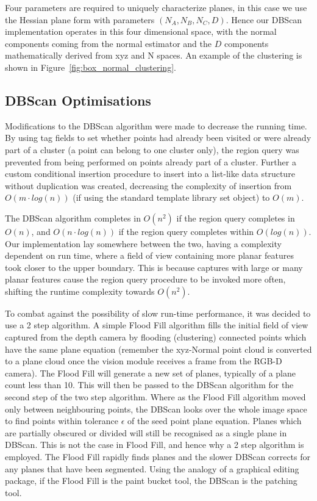 \documentclass[]{article}
\begin{document}
{Four parameters are required to uniquely characterize planes, in this case we use the Hessian plane form with parameters $(N_A, N_B, N_C, D)$. Hence our DBScan implementation operates in this four dimensional space, with the normal components coming from the normal estimator and the $D$ components mathematically derived from xyz and N spaces. An example of the clustering is shown in Figure~\ref{fig:box_normal_clustering}.

\subsection{DBScan Optimisations} %
\label{sub:dbscan_optimisations}


Modifications to the DBScan algorithm were made to decrease the running time. By using tag fields to set whether points had already been visited or were already part of a cluster (a point can belong to one cluster only), the region query was prevented from being performed on points already part of a cluster. Further a custom conditional insertion procedure to insert into a list-like data structure without duplication was created, decreasing the complexity of insertion from $O(m \cdot log(n))$ (if using the standard template library set object) to $O(m)$.

The DBScan algorithm completes in $O(n^2)$ if the region query completes in $O(n)$, and $O(n \cdot log(n))$ if the region query completes within $O(log(n))$. Our implementation lay somewhere between the two, having a complexity dependent on run time, where a field of view containing more planar features took closer to the upper boundary. This is because captures with large or many planar features cause the region query procedure to be invoked more often, shifting the runtime complexity towards $O(n^2)$.

To combat against the possibility of slow run-time performance, it was decided to use a 2 step algorithm. A simple Flood Fill algorithm fills the initial field of view captured from the depth camera by flooding (clustering) connected points which have the same plane equation (remember the xyz-Normal point cloud is converted to a plane cloud once the vision module receives a frame from the RGB-D camera). The Flood Fill will generate a new set of planes, typically of a plane count less than 10. This will then be passed to the DBScan algorithm for the second step of the two step algorithm. Where as the Flood Fill algorithm moved only between neighbouring points, the DBScan looks over the whole image space to find points within tolerance $\epsilon$ of the seed point plane equation. Planes which are partially obscured or divided  will still be recognised as a single plane in DBScan. This is not the case in Flood Fill, and hence why a 2 step algorithm is employed. The Flood Fill rapidly finds planes and the slower DBScan corrects for any planes that have been segmented. Using the analogy of a graphical editing package, if the Flood Fill is the paint bucket tool, the DBScan is the patching tool.

}
\end{document}
